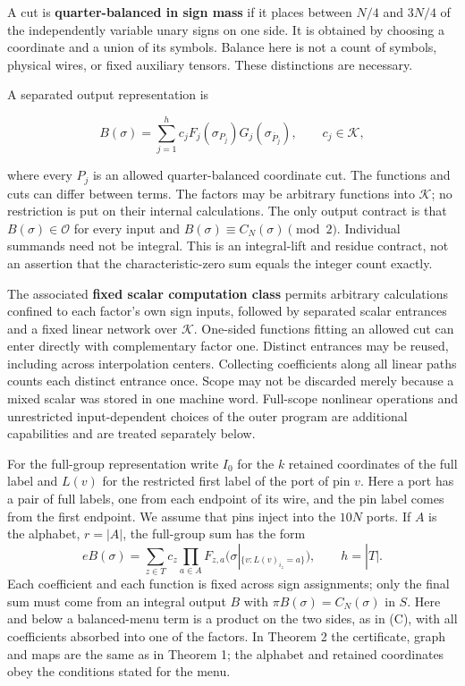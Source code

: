 \documentclass[
  11pt,
]{article}
\begin{document}
A cut is \textbf{quarter-balanced in sign mass} if it places between
\(N/4\) and \(3N/4\) of the independently variable unary signs on one
side. It is obtained by choosing a coordinate and a union of its
symbols. Balance here is not a count of symbols, physical wires, or
fixed auxiliary tensors. These distinctions are necessary.

A separated output representation is

\[
B(\sigma)=\sum_{j=1}^{h}c_j F_j(\sigma_{P_j})G_j(\sigma_{\overline P_j}),
\qquad c_j\in\mathcal K,
\tag{C}
\]

where every \(P_j\) is an allowed quarter-balanced coordinate cut. The
functions and cuts can differ between terms. The factors may be
arbitrary functions into \(\mathcal K\); no restriction is put on their
internal calculations. The only output contract is that
\(B(\sigma)\in\mathcal O\) for every input and
\(B(\sigma)\equiv C_N(\sigma)\pmod2\). Individual summands need not be
integral. This is an integral-lift and residue contract, not an
assertion that the characteristic-zero sum equals the integer count
exactly.

The associated \textbf{fixed scalar computation class} permits arbitrary
calculations confined to each factor's own sign inputs, followed by
separated scalar entrances and a fixed linear network over
\(\mathcal K\). One-sided functions fitting an allowed cut can enter
directly with complementary factor one. Distinct entrances may be
reused, including across interpolation centers. Collecting coefficients
along all linear paths counts each distinct entrance once. Scope may not
be discarded merely because a mixed scalar was stored in one machine
word. Full-scope nonlinear operations and unrestricted input-dependent
choices of the outer program are additional capabilities and are treated
separately below.

For the full-group representation write \(I_0\) for the \(k\) retained
coordinates of the full label and \(L(v)\) for the restricted first label
of the port of pin \(v\). Here a port has a pair of full labels, one from each endpoint of its wire, and the pin label comes from the first endpoint. We assume that pins inject into the \(10N\)
ports. If \(A\) is the alphabet, \(r=|A|\), the full-group sum has the form
\[
 eB(\sigma)=\sum_{z\in T}c_z\prod_{a\in A}
 F_{z,a}\bigl(\sigma|_{\{v:L(v)_{i_z}=a\}}\bigr),\qquad h=|T|.
 \tag{D}
\]
Each coefficient and each function is fixed across sign assignments;
only the final sum must come from an integral output \(B\) with
\(\pi B(\sigma)=C_N(\sigma)\) in \(S\). Here and below a balanced-menu
term is a product on the two sides, as in (C), with all coefficients
absorbed into one of the factors. In Theorem 2 the certificate, graph
and maps are the same as in Theorem 1; the alphabet and retained
coordinates obey the conditions stated for the menu.
\end{document}
